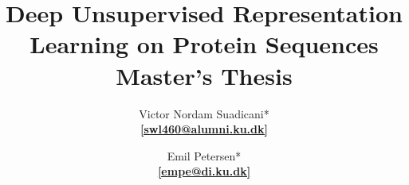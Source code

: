 \title{
    \Huge{\textbf{Deep Unsupervised Representation Learning on Protein Sequences}} \\
    \vspace{1cm}
    \Large{Master's Thesis}
}

\author{{\Large Victor Nordam Suadicani}* \\ \href{mailto:nordam@di.ku.dk}{\textbf{[swl460@alumni.ku.dk]}} \and {\Large Emil Petersen}* \\ \href{mailto:empe@di.ku.dk}{\textbf{[empe@di.ku.dk]}}
}





\maketitle

\thispagestyle{empty}

\newpage
\setcounter{page}{1}
